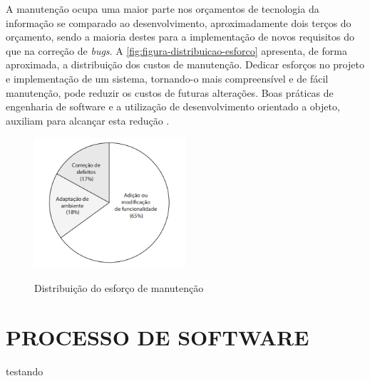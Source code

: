 A manutenção ocupa uma maior parte nos orçamentos de tecnologia da informação se comparado ao desenvolvimento, aproximadamente dois terços do orçamento, sendo a maioria destes para a implementação de novos requisitos do que na correção de \textit{bugs}. A \autoref{fig:figura-distribuicao-esforco} apresenta, de forma aproximada, a distribuição dos custos de manutenção. Dedicar esforços no projeto e implementação de um sistema, tornando-o mais compreensível e de fácil manutenção, pode reduzir os custos de futuras alterações. Boas práticas de engenharia de software e a utilização de desenvolvimento orientado a objeto, auxiliam para alcançar esta redução \cite{iansommerville}.
\begin{figure}[!htb]
    \centering
    \caption{Distribuição do esforço de manutenção}
    \includegraphics[width=0.5\textwidth]{./dados/figuras/distribuicao_do_esforco_de_manutencao}
    \label{fig:figura-distribuicao-esforco}
\end{figure}



\section{PROCESSO DE SOFTWARE}
\label{sec:processoDeSoftware}

testando 